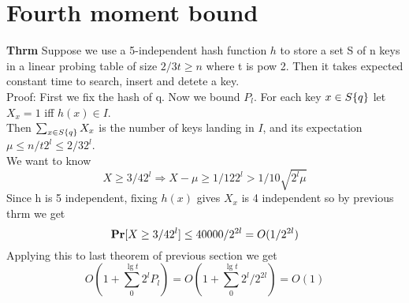 \documentclass[a4paper]{article}
\def\Pr{\mbox{\textbf{Pr}}}
\begin{document}
\section{Fourth moment bound}
\textbf{Thrm} Suppose we use a 5-independent hash function \(h\) to store a set S of n keys in a linear probing table of size \(2/3t \geq n\) where t is pow 2. Then it takes expected constant time to search, insert and detete a key.\\
Proof: First we fix the hash of q. Now we bound \(P_l\). For each key \(x \in S\\\{q\}\) let \(X_x = 1\) iff \(h(x)\in I\). \\
Then \(\sum_{x \in S\\\{q\}} X_x\) is the number of keys landing in \(I\), and its expectation \(\mu \leq n/t 2^l \leq 2/3 2^l\).\\
We want to know 
\[X \geq 3/4 2^l \Rightarrow X-\mu \geq 1/12 2^l > 1/10\sqrt{2^l \mu}\]
Since h is 5 independent, fixing \(h(x)\) gives \(X_x\) is 4 independent so by previous thrm we get
\[\Pr[X \geq 3/4 2^l] \leq 40000/2^{2l} = O(1/2^{2l})\]
Applying this to last theorem of previous section we get
\[O(1+\sum_0^{\lg t} 2^lP_l) = O(1+\sum_0^{\lg t} 2^l/2^{2l}) = O(1)\]
\end{document}
